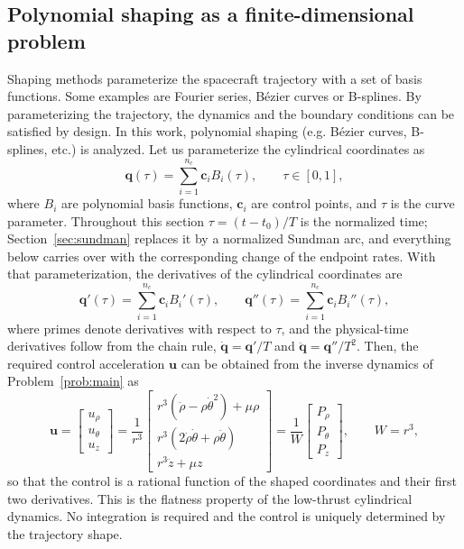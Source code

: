 \subsection{Polynomial shaping as a finite-dimensional problem}
\label{sec:shaping}

Shaping methods parameterize the spacecraft trajectory with a set of basis
functions. Some examples are Fourier series, B\'ezier curves or B-splines. By
parameterizing the trajectory, the dynamics and the boundary conditions can be
satisfied by design. In this work, polynomial shaping (e.g. B\'ezier curves,
B-splines, etc.) is analyzed. Let us parameterize the cylindrical coordinates as
\begin{equation}
\mathbf{q}(\tau)=\sum^{n_c}_{i=1}\mathbf{c}_i B_i(\tau),\qquad\tau\in[0,1],
\label{eq:shaping}
\end{equation}
where $B_i$ are polynomial basis functions, $\mathbf{c}_i$ are control points,
and $\tau$ is the curve parameter. Throughout this section $\tau=(t-t_0)/T$ is
the normalized time; Section~\ref{sec:sundman} replaces it by a normalized
Sundman arc, and everything below carries over with the corresponding
change of the endpoint rates. With that parameterization, the derivatives of the
cylindrical coordinates are
\begin{equation}
\mathbf{q}'(\tau)=\sum^{n_c}_{i=1}\mathbf{c}_i B_i'(\tau),\quad\quad
\mathbf{q}''(\tau)=\sum^{n_c}_{i=1}\mathbf{c}_i B_i''(\tau),
\end{equation}
where primes denote derivatives with respect to $\tau$, and the physical-time
derivatives follow from the chain rule,
$\dot{\mathbf q}=\mathbf q'/T$ and $\ddot{\mathbf q}=\mathbf q''/T^2$. Then,
the required control acceleration $\mathbf{u}$ can be obtained from the inverse dynamics of
Problem~\eqref{prob:main} as
\begin{equation}
	\mathbf{u}
	=
	\begin{bmatrix}
		u_\rho\\
		u_\theta\\
		u_z
	\end{bmatrix}
	=
	\dfrac{1}{r^3}\begin{bmatrix}
		r^3(\ddot{\rho}-\rho\dot{\theta}^{2})+\mu\rho\\[1mm]
		r^3(2\dot{\rho}\dot{\theta}+\rho\ddot{\theta})\\[1mm]
		r^3\ddot{z}+\mu z
	\end{bmatrix}=\dfrac{1}{W}
	\begin{bmatrix}
	P_\rho\\[1mm]
	P_\theta\\[1mm]
	P_z
	\end{bmatrix},\qquad W=r^3,
	\label{eq:flatness2}
\end{equation}
so that the control is a rational function of the shaped coordinates and
their first two derivatives. This is the flatness property of the low-thrust cylindrical
dynamics. No integration is required and the control is uniquely determined by
the trajectory shape.

